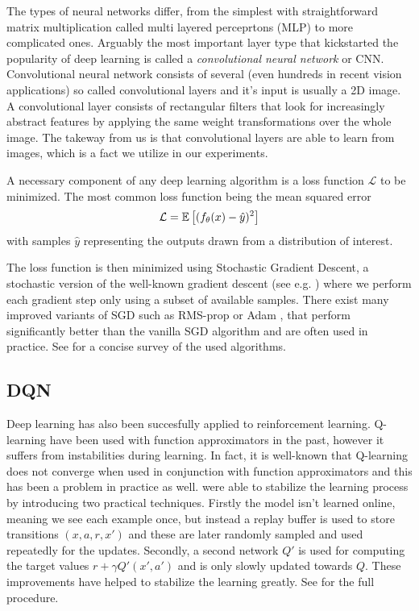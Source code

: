 The types of neural networks differ, from the simplest with straightforward matrix multiplication called multi layered perceprtons (MLP) to more complicated ones. Arguably the most important layer type that kickstarted the popularity of deep learning is called a \textit{convolutional neural network} or CNN. Convolutional neural network consists of several (even hundreds in recent vision applications) so called convolutional layers and it's input is usually a 2D image. A convolutional layer consists of rectangular filters that look for increasingly abstract features by applying the same weight transformations over the whole image. The takeway from us is that convolutional layers are able to learn from images, which is a fact we utilize in our experiments.

A necessary component of any deep learning algorithm is a loss function $\mathcal{L}$ to be minimized. The most common loss function being the mean squared error
\begin{equation*}
\mathcal{L} = \mathbb{E}\left[ {(f_\theta(x) - \hat{y})^2} \right]
\end{equation*}
with samples $\hat{y}$ representing the outputs drawn from a distribution of interest. 

The loss function is then minimized using Stochastic Gradient Descent, a stochastic version of the well-known gradient descent (see e.g. \citet{boyd2004convex}) where we perform each gradient step only using a subset of available samples. 
There exist many improved variants of SGD such as RMS-prop \cite{tieleman2012lecture} or Adam \citep{kingma2014adam}, that perform significantly better than the vanilla SGD algorithm and are often used in practice. See \citet{ruder2016overview} for a concise survey of the used algorithms.


\subsection{DQN}

Deep learning has also been succesfully applied to reinforcement learning. Q-learning have been used with function approximators in the past, however it suffers from instabilities during learning. In fact, it is well-known that Q-learning does not converge when used in conjunction with function approximators \citep{baird1995residual, sutton1998reinforcement} and this has been a problem in practice as well. \citet{mnih2015human} were able to stabilize the learning process by introducing two practical techniques. Firstly the model isn't learned online, meaning we see each example once, but instead a replay buffer is used to store transitions $(x, a, r, x')$ and these are later randomly sampled and used repeatedly for the updates. Secondly, a second network $Q'$ is used for computing the target values $r + \gamma Q'(x', a')$ and is only slowly updated towards $Q$. These improvements have helped to stabilize the learning greatly. See  for the full procedure.

